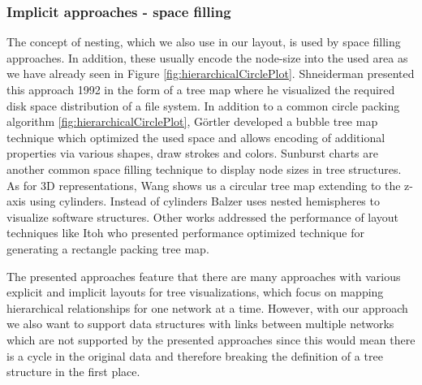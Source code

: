 \subsubsection{Implicit approaches - space filling}
The concept of nesting, which we also use in our layout, is used by space filling approaches. In addition, these usually encode the node-size into the used area as we have already seen in Figure \ref{fig:hierarchicalCirclePlot}.
Shneiderman \cite{shneiderman_tree_1992} presented this approach 1992 in the form of a tree map where he visualized the required disk space distribution of a file system. In addition to a common circle packing algorithm \ref{fig:hierarchicalCirclePlot}, Görtler \cite{gortler_bubble_2018} developed a bubble tree map technique which optimized the used space and allows encoding of additional properties via various shapes, draw strokes and colors. Sunburst charts are another common space filling technique to display node sizes in tree structures. 
As for 3D representations, Wang \cite{wang_visualization_2006} shows us a circular tree map extending to the z-axis using cylinders. Instead of cylinders Balzer \cite{balzer_hierarchy_2004} uses nested hemispheres to visualize software structures.
Other works addressed the performance of layout techniques like Itoh \cite{itoh_hierarchical_2004} who presented performance optimized technique for generating a rectangle packing tree map.

The presented approaches feature that there are many approaches with various explicit and implicit layouts for tree visualizations, which focus on mapping hierarchical relationships for one network at a time. However, with our approach we also want to support data structures with links between multiple networks which are not supported by the presented approaches since this would mean there is a cycle in the original data and therefore breaking the definition of a tree structure in the first place.

